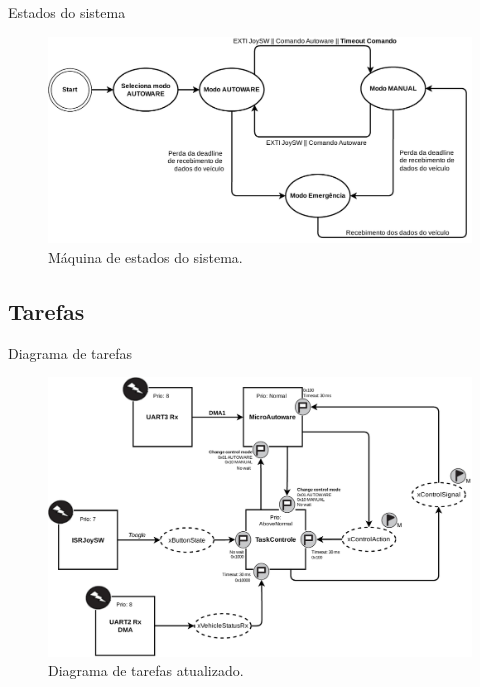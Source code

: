 \documentclass{if-beamer}
\begin{document}
\begin{frame}{Estados do sistema}
	
	
	\begin{figure}[H]
		\centering
		\includegraphics[width = \textwidth]{img/maquinadeestados}
		\caption{Máquina de estados do sistema.}
		\label{fig:maquinadeestados}
	\end{figure}
	
	
\end{frame}

\subsection*{Tarefas}

\begin{frame}{Diagrama de tarefas}
	
	\begin{figure}[H]
		\centering
		\includegraphics[width=0.75\linewidth]{system_diagram}
		\caption{Diagrama de tarefas atualizado.}
		\label{fig:system_diagram}
	\end{figure}
	
\end{frame}
\end{document}
